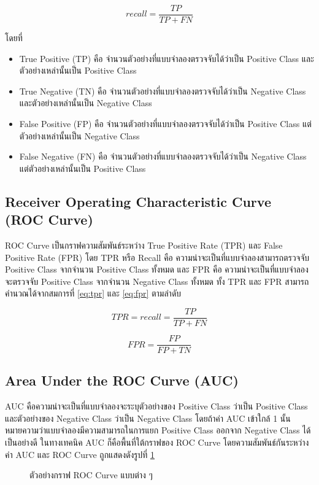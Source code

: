 \begin{equation}
  recall = \frac{TP}{TP + FN}
  \label{eq:recall}
\end{equation}

โดยที่

\begin{itemize}
  \item True Positive (TP) คือ จำนวนตัวอย่างที่แบบจำลองตรวจจับได้ว่าเป็น Positive Class และตัวอย่างเหล่านั้นเป็น Positive Class
  \item True Negative (TN) คือ จำนวนตัวอย่างที่แบบจำลองตรวจจับได้ว่าเป็น Negative Class และตัวอย่างเหล่านั้นเป็น Negative Class
  \item False Positive (FP) คือ จำนวนตัวอย่างที่แบบจำลองตรวจจับได้ว่าเป็น Positive Class แต่ตัวอย่างเหล่านั้นเป็น Negative Class
  \item False Negative (FN) คือ จำนวนตัวอย่างที่แบบจำลองตรวจจับได้ว่าเป็น Negative Class แต่ตัวอย่างเหล่านั้นเป็น Positive Class
\end{itemize}

\subsection{Receiver Operating Characteristic Curve (ROC Curve)}
ROC Curve เป็นกราฟความสัมพันธ์ระหว่าง True Positive Rate (TPR) และ False Positive Rate (FPR) โดย TPR หรือ Recall คือ 
ความน่าจะเป็นที่แบบจำลองสามารถตรวจจับ Positive Class จากจำนวน Positive Class ทั้งหมด และ FPR คือ 
ความน่าจะเป็นที่แบบจำลองจะตรวจจับ Positive Class จากจำนวน Negative Class ทั้งหมด ทั้ง TPR และ FPR สามารถคำนวณได้จากสมการที่ \ref{eq:tpr} และ \ref{eq:fpr} ตามลำดับ

\begin{equation}
  TPR = recall = \frac{TP}{TP + FN}
  \label{eq:tpr}
\end{equation}

\begin{equation}
  FPR = \frac{FP}{FP + TN}
  \label{eq:fpr}
\end{equation}

\subsection{Area Under the ROC Curve (AUC)}
AUC คือความน่าจะเป็นที่แบบจำลองจะระบุตัวอย่างของ Positive Class ว่าเป็น Positive Class และตัวอย่างของ Negative Class ว่าเป็น Negative Class 
โดยถ้าค่า AUC เข้าใกล้ 1 นั้นหมายความว่าแบบจำลองมีความสามารถในการแยก Positive Class ออกจาก Negative Class ได้เป็นอย่างดี 
ในทางเทคนิค AUC ก็คือพื้นที่ใต้กราฟของ ROC Curve โดยความสัมพันธ์กันระหว่างค่า AUC และ ROC Curve ถูกแสดงดังรูปที่ \ref{fig:roc}

\begin{figure}[h]
  \centering
  \caption{ตัวอย่างกราฟ ROC Curve แบบต่าง ๆ}
  \label{fig:roc}
\end{figure}
\FloatBarrier
